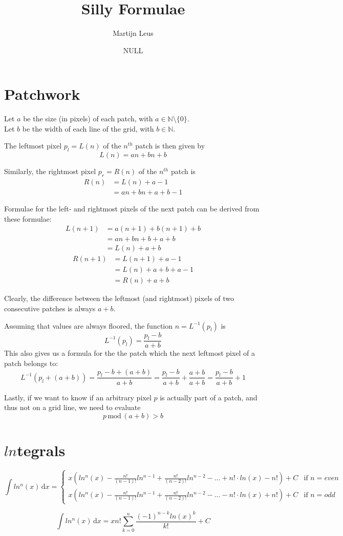 \documentclass{article}
\newcommand{\dif}[1]{\,\mathrm{d}#1}
\begin{document}
\title{Silly Formulae}
\author{Martijn Leus}
\date{NULL}

\maketitle

\section{Patchwork}

Let $a$ be the size (in pixels) of each patch, with $a\in\mathbb{N}\setminus\{0\}$.\\
Let $b$ be the width of each line of the grid, with $b\in\mathbb{N}$.

The leftmost pixel $p_l=L(n)$ of the $n^{th}$ patch is then given by
$$L(n)=an + bn + b$$

Similarly, the rightmost pixel  $p_r=R(n)$ of the $n^{th}$ patch is
\begin{align*}
	R(n) &= L(n) + a - 1 \\
	&= an + bn + a + b - 1
\end{align*}

Formulae for the left- and rightmost pixels of the next patch can be derived from these formulae:
\begin{align*}
	L(n+1) &=a(n+1) + b(n+1) + b \\
	&= an + bn + b + a + b \\
	&= L(n) + a + b
\end{align*}
\begin{align*}
	R(n+1) &=L(n+1) + a - 1 \\
	&= L(n) + a + b + a - 1 \\
	&= R(n) + a + b
\end{align*}

Clearly, the difference between the leftmost (and rightmost) pixels of two consecutive patches is always $a + b$.

Assuming that values are always floored, the function $n=L^{-1}(p_l)$ is
$$L^{-1}(p_l)={\frac{p_l-b}{a+b}}$$
This also gives us a formula for the the patch which the next leftmost pixel of a patch belongs to:
$$L^{-1}(p_l + (a + b))=\frac{p_l-b+(a+b)}{a+b}=\frac{p_l-b}{a+b}+\frac{a+b}{a+b}=\frac{p_l-b}{a+b}+1$$

Lastly, if we want to know if an arbitrary pixel $p$ is actually part of a patch, and thus not on a grid line, we need to evaluate
$$p\,\mathrm{mod}\,(a + b) > b$$

\section{$ln$tegrals}
$$\int ln^n(x)\dif{x}=
\begin{cases}
x(ln^n(x)-\frac{n!}{(n-1)!}ln^{n-1}+\frac{n!}{(n-2)!}ln^{n-2}-...+n!\cdot ln(x)-n!)+C & \text{if } n=even \\ 
x(ln^n(x)-\frac{n!}{(n-1)!}ln^{n-1}+\frac{n!}{(n-2)!}ln^{n-2}-...-n!\cdot ln(x)+n!)+C & \text{if } n=odd
\end{cases}$$

$$\int ln^n(x)\dif{x}=xn!\sum_{k=0}^{n}\frac{(-1)^{n-k}ln(x)^k}{k!}+C$$
\end{document}
